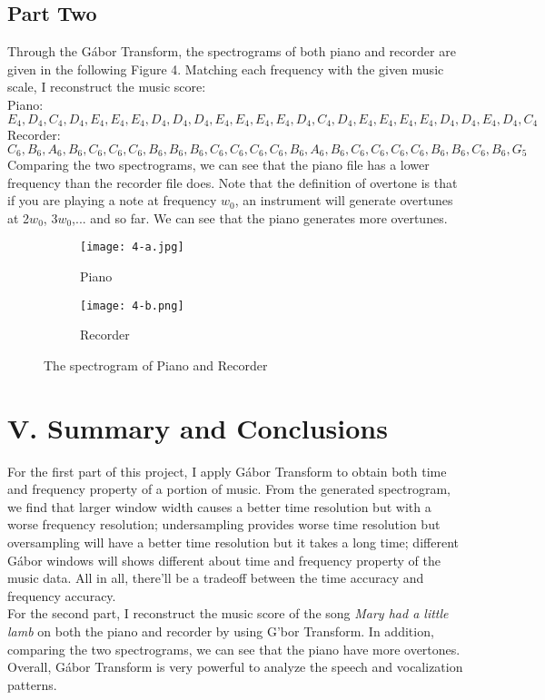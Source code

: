 \documentclass[12pt,letterpaper]{article}
\begin{document}
\subsection*{Part Two}
Through the G\'abor Transform, the spectrograms of both piano and recorder are given in the following Figure 4. Matching each frequency with the given music scale, I reconstruct the music score:
\\Piano: $E_4,D_4,C_4,D_4,E_4,E_4,E_4,D_4,D_4,D_4,E_4,E_4,E_4,E_4,D_4,C_4,D_4,E_4,E_4,E_4,
E_4,D_4,D_4,E_4,D_4,C_4$
\\Recorder:
$C_6,B_6,A_6,B_6,C_6,C_6,C_6,B_6,B_6,B_6,C_6,C_6,C_6,C_6,B_6,A_6,B_6,C_6,C_6,C_6,
C_6,B_6,B_6,C_6,B_6,G_5$
Comparing the two spectrograms, we can see that the piano file has a lower frequency than the recorder file does. Note that the definition of overtone is that if you are playing a note at frequency $w_0$, an instrument will generate overtunes at 2$w_0$, 3$w_0$,... and so far. We can see that the piano generates more overtunes. 
\begin{figure}[ht]
\begin{subfigure}{.5\textwidth}
  \centering
  \texttt{[image: 4-a.jpg]}  
  \caption{Piano}
  \label{fig:sub-first}
\end{subfigure}
\begin{subfigure}{.5\textwidth}
  \centering
  \texttt{[image: 4-b.png]}  
  \caption{Recorder}
  \label{fig:sub-second}
\end{subfigure}
\label{fig:fig}
\caption{The spectrogram of Piano and Recorder}
\end{figure}


\section*{V. Summary and Conclusions}
For the first part of this project, I apply G\'abor Transform to obtain both time and frequency property of a portion of music. From the generated spectrogram, we find that larger window width causes a better time resolution but with a worse frequency resolution; undersampling provides worse time resolution but oversampling will have a better time resolution but it takes a long time; different G\'abor windows will shows different about time and frequency property of the music data. All in all, there'll be a tradeoff between the time accuracy and frequency accuracy. 
\\For the second part, I reconstruct the music score of the song \textit{Mary had a little lamb} on both the piano and recorder by using G\a'bor Transform. In addition, comparing the two spectrograms, we can see that the piano have more overtones. Overall, G\'abor Transform is very powerful to analyze the speech and vocalization patterns. 
\end{document}
